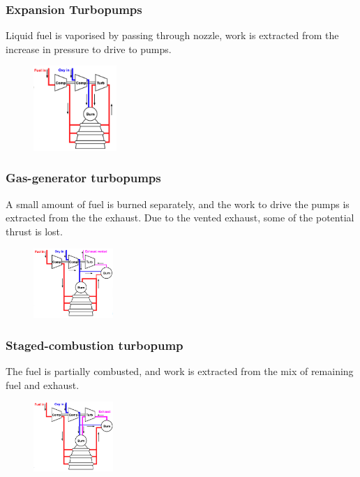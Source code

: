 \documentclass[a4paper,10pt]{article}
\begin{document}
\begin{multicols}{4}
\subsubsection*{Expansion Turbopumps}
Liquid fuel is vaporised by passing through nozzle, work is extracted from the increase in pressure to drive to pumps. 
\begin{figure}[H]
    \centering
    \includegraphics[width=0.28\textwidth]{Figure/turbopump1.png}
\end{figure}

\subsubsection*{Gas-generator turbopumps}
A small amount of fuel is burned separately, and the work to drive the pumps is extracted from the the exhaust. Due to the vented exhaust, some of the potential thrust is lost. 
\begin{figure}[H]
    \centering
    \includegraphics[width=0.27\textwidth]{Figure/turbopump.png}
\end{figure}

\subsubsection*{Staged-combustion turbopump}
The fuel is partially combusted, and work is extracted from the mix of remaining fuel and exhaust.
\vspace*{2cm}
\begin{figure}[H]
    \centering
    \includegraphics[width=0.27\textwidth]{Figure/staged1.png}
\end{figure}


\end{multicols}
\end{document}
